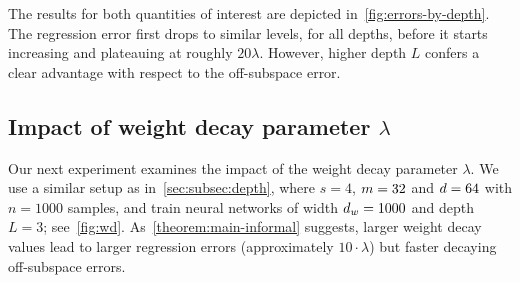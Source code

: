 The results for both quantities of interest are depicted in~\cref{fig:errors-by-depth}.
The regression error first drops to similar levels, for all depths, before it starts increasing and
plateauing at roughly $20 \lambda$. However, higher depth $L$ confers a clear advantage with respect to the off-subspace error.


\subsection{Impact of weight decay parameter $\lambda$}
\label{sec:subsec:wd}
Our next experiment examines the impact of the weight decay parameter $\lambda$.
We use a similar setup as in~\cref{sec:subsec:depth}, where $s = 4$, $m = 32$ and $d = 64$ with $n = 1000$ samples,
and train neural networks of width $d_{w} = 1000$ and depth $L = 3$;
see~\cref{fig:wd}.
As~\cref{theorem:main-informal} suggests, larger weight decay values lead to
larger regression errors (approximately $10 \cdot \lambda$) but faster decaying off-subspace errors.




